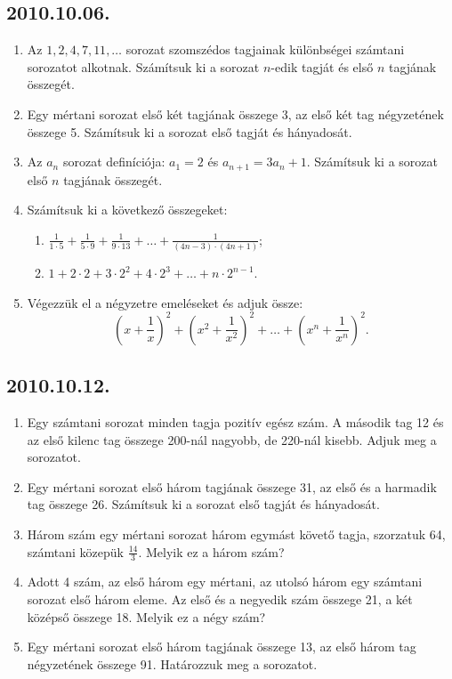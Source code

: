 \documentclass{article}
\newenvironment{abc}{\begin{enumerate}[label=\textit{\alph*})]}{\end{enumerate}}
\begin{document}
\subsection*{2010.10.06.}
\begin{enumerate}
\item Az $1,2,4,7,11,\ldots$ sorozat szomszédos tagjainak különbségei számtani sorozatot alkotnak. Számítsuk ki a sorozat $n$-edik tagját és első $n$ tagjának összegét.
\item Egy mértani sorozat első két tagjának összege 3, az első két tag négyzetének összege 5. Számítsuk ki a sorozat első tagját és hányadosát.
\item Az $a_n$ sorozat definíciója: $a_1=2$ és 
$a_{n+1}=3a_n+1$. Számítsuk ki a sorozat első $n$ tagjának összegét.
\item Számítsuk ki a következő összegeket:
\begin{abc}
\item $\frac{1}{1\cdot 5}+\frac{1}{5\cdot 9}
+\frac{1}{9\cdot 13}+\ldots+\frac{1}{(4n-3)\cdot(4n+1)}$;
\item $1+2\cdot 2+3\cdot 2^2+4\cdot 2^3+\ldots+
n\cdot 2^{n-1}$.
\end{abc}
\item Végezzük el a négyzetre emeléseket és adjuk össze:
$$
\left(x+\frac{1}{x}\right)^2+
\left(x^2+\frac{1}{x^2}\right)^2+
\ldots
+\left(x^n+\frac{1}{x^n}\right)^2.
$$
\end{enumerate}


\subsection*{2010.10.12.}
\begin{enumerate}
\item Egy számtani sorozat minden tagja pozitív egész szám. A második tag 12 és az első kilenc tag összege 200-nál nagyobb, de 220-nál kisebb. Adjuk meg a sorozatot.
\item Egy mértani sorozat első három tagjának összege 31, az első és a harmadik tag összege 26. Számítsuk ki a sorozat első tagját és hányadosát.
\item Három szám egy mértani sorozat három egymást követő tagja, szorzatuk 64, számtani közepük $\frac{14}{3}$. Melyik ez a három szám?
\item Adott 4 szám, az első három egy mértani, az utolsó három egy számtani sorozat első három eleme. Az első és a negyedik szám összege 21, a két középső összege 18. Melyik ez a négy szám?
\item Egy mértani sorozat első három tagjának összege 13, az első három tag négyzetének összege 91. Határozzuk meg a sorozatot.
\end{enumerate}
\end{document}
